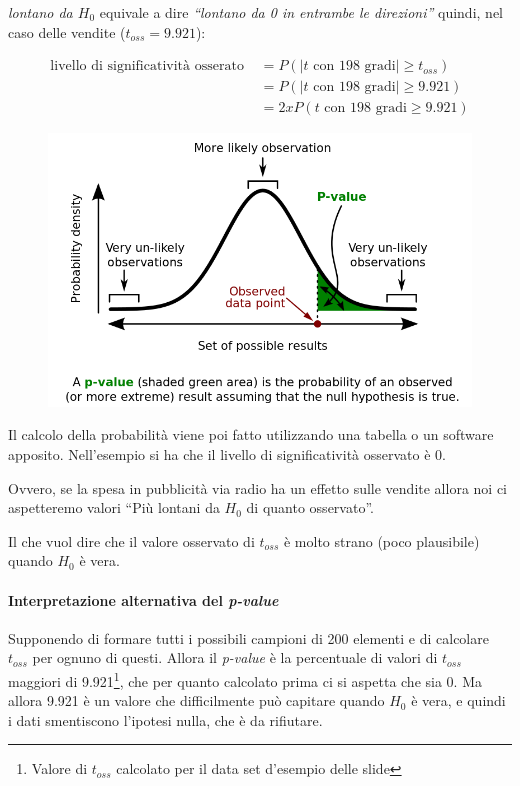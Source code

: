 \emph{lontano da $ H_0 $} equivale a dire \emph{``lontano da 0 in entrambe le
direzioni''} quindi, nel caso delle vendite ($ t_{oss} = 9.921 $):

\begin{align*}
\text{livello di significatività osserato } &= P(|t \text{ con 198 gradi}| \geq t_{oss}) \\
																	&= P(|t \text{ con 198 gradi}| \geq 9.921) \\
														           &= 2xP(t \text{ con 198 gradi} \geq 9.921)
\end{align*}

\begin{figure}[htbp]
	\centering
	\includegraphics[width=.7\textwidth]{./notes/immagini/l6-fig7-1.png}
\end{figure}

Il calcolo della probabilità viene poi fatto utilizzando una tabella o
un software apposito. Nell'esempio si ha che il livello di significatività osservato è 0.

Ovvero, se la spesa in pubblicità via radio ha un effetto sulle vendite allora noi ci aspetteremo valori ``Più lontani da $ H_0 $ di quanto
osservato''.

Il che vuol dire che il valore osservato di $ t_{oss} $ è molto strano (poco plausibile) quando $ H_0 $ è vera.

\paragraph{Interpretazione alternativa del \textit{p-value}} Supponendo di formare tutti i possibili campioni di 200 elementi e di calcolare $ t_{oss} $ per ognuno di questi. Allora il \textit{p-value} è la percentuale di valori di $ t_{oss} $ maggiori di 9.921\footnote{Valore di $ t_{oss} $ calcolato per il data set d'esempio delle slide}, che per quanto calcolato prima ci si aspetta che sia 0. Ma allora 9.921 è un valore che difficilmente può capitare quando $ H_0 $ è vera, e quindi i dati smentiscono l'ipotesi nulla, che è da rifiutare.

